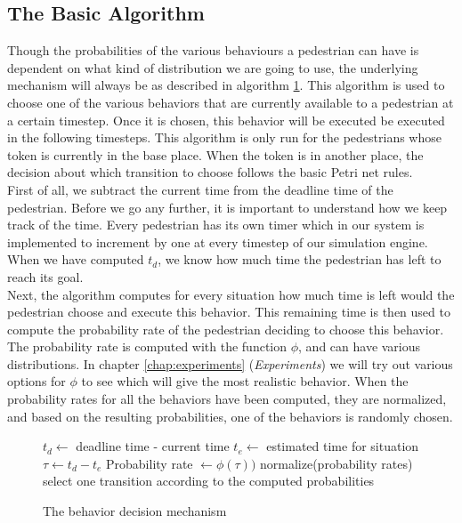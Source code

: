 \documentclass[11pt, a4paper]{book}
\begin{document}
\subsection{The Basic Algorithm}
Though the probabilities of the various behaviours a pedestrian can have is dependent on what kind of distribution we are going to use, the underlying mechanism will always be as described in algorithm \ref{decisionmechanism}. This algorithm is used to choose one of the various behaviors that are currently available to a pedestrian at a certain timestep. Once it is chosen, this behavior will be executed be executed in the following timesteps. This algorithm is only run for the pedestrians whose token is currently in the base place. When the token is in another place, the decision about which transition to choose follows the basic Petri net rules.\\
First of all, we subtract the current time from the deadline time of the pedestrian.  Before we go any further, it is important to understand how we keep track of the time.  Every pedestrian has its own timer which in our system is implemented to increment by one at every timestep of our simulation engine. When we have computed $t_d$, we know how much time the pedestrian has left to reach its goal.\\
Next, the algorithm computes for every situation how much time is left would the pedestrian choose and execute this behavior. This remaining time is then used to compute the probability rate of the pedestrian deciding to choose this behavior. The probability rate is computed with the function $\phi$, and can have various distributions. In chapter \ref{chap:experiments} (\emph{Experiments}) we will try out various options for $\phi$ to see which will give the most realistic behavior. When the probability rates for all the behaviors have been computed, they are normalized, and based on the resulting probabilities, one of the behaviors is randomly chosen.

\begin{figure}
\begin{algorithm}
\caption{The behavior decision mechanism}
\label{decisionmechanism}
\begin{algorithmic}
\State $t_d \gets $ deadline time - current time 
\State $t_e \gets $ estimated time for situation
\State $\tau \gets t_d - t_e$
\State Probability rate $\gets \phi(\tau))$
\EndFor
\State normalize(probability rates)
\State select one transition according to the computed probabilities
\end{algorithmic}
\end{algorithm}
\end{figure}
\end{document}
